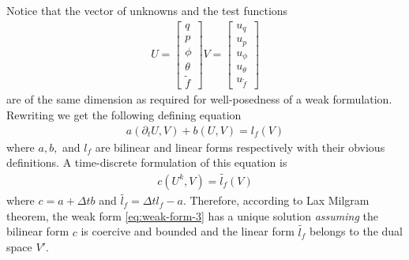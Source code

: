 \documentclass[12pt]{article}
\begin{document}
Notice that the vector of unknowns and the test functions
\begin{align}
U =
\begin{bmatrix}
q \\ p \\ \phi \\ \theta \\ \tilde{f}
\end{bmatrix}
V =
\begin{bmatrix}
u_q \\ u_p \\ u_\phi \\ u_\theta \\ u_{\tilde{f}}
\end{bmatrix}
\end{align}
are of the same dimension as required for well-posedness of a weak formulation. Rewriting  we get the following defining equation
\begin{align}
a(\partial_t U,V) + b(U,V) = l_f(V)
\end{align}
where $a,b,$ and $l_f$ are bilinear and linear forms respectively with their obvious definitions. A time-discrete formulation of this equation is
\begin{align}
c(U^k, V) = \tilde{l_f}(V)
\end{align}
where $c = a + \Delta t b$ and $\tilde{l_f} = \Delta t l_f - a$. Therefore, according to Lax Milgram theorem, the weak form \eqref{eq:weak-form-3} has a unique solution \emph{assuming} the bilinear form $c$ is coercive and bounded and the linear form $\tilde{l_f}$ belongs to the dual space $V'$.

\cite{WSH14}



\end{document}
